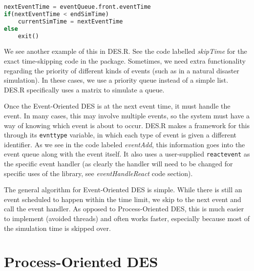 \documentclass[a4paper, 11pt]{article} %
\begin{document}
\begin{lstlisting}[language=Python,caption=Skip Time Algorithm]
nextEventTime = eventQueue.front.eventTime
if(nextEventTime < endSimTime)
	currentSimTime = nextEventTime
else
	exit()
\end{lstlisting}

We see another example of this in DES.R. See the code labelled \textit{skipTime} for the exact time-skipping code in the package. Sometimes, we need extra functionality regarding the priority of different kinds of events (such as in a natural disaster simulation). In these cases, we use a priority queue instead of a simple list. DES.R specifically uses a matrix to simulate a queue.

Once the Event-Oriented DES is at the next event time, it must handle the event. In many cases, this may involve multiple events, so the system must have a way of knowing which event is about to occur. DES.R makes a framework for this through its \texttt{evnttype} variable, in which each type of event is given a different identifier. As we see in the code labeled \textit{eventAdd}, this information goes into the event queue along with the event itself. It also uses a user-supplied \texttt{reactevent} as the specific event handler (as clearly the handler will need to be changed for specific uses of the library, see \textit{eventHandleReact} code section).

The general algorithm for Event-Oriented DES is simple. While there is still an event scheduled to happen within the time limit, we skip to the next event and call the event handler. As opposed to Process-Oriented DES, this is much easier to implement (avoided threads) and often works faster, especially because most of the simulation time is skipped over. \newline


\pagebreak


\section{Process-Oriented DES}

\end{document}
